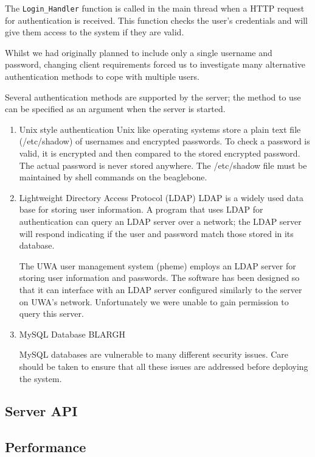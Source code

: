 The \verb/Login_Handler/ function is called in the main thread when a HTTP request for authentication is received. This function checks the user's credentials and will give them access to the system if they are valid.

Whilst we had originally planned to include only a single username and password, changing client requirements forced us to investigate many alternative authentication methods to cope with multiple users.

Several authentication methods are supported by the server; the method to use can be specified as an argument when the server is started.
\begin{enumerate}
  \item Unix style authentication
  Unix like operating systems store a plain text file (/etc/shadow) of usernames and encrypted passwords. To check a password is valid, it is encrypted and then compared to the stored encrypted password. The actual password is never stored anywhere. The /etc/shadow file must be maintained by shell commands on the beaglebone.

  \item Lightweight Directory Access Protocol (LDAP)
  LDAP is a widely used data base for storing user information. A program that uses LDAP for authentication can query an LDAP server over a network; the LDAP server will respond indicating if the user and password match those stored in its database.

  The UWA user management system (pheme) employs an LDAP server for storing user information and passwords. The software has been designed so that it can interface with an LDAP server configured similarly to the server on UWA's network. Unfortunately we were unable to gain permission to query this server.

  \item MySQL Database
  BLARGH

  MySQL databases are vulnerable to many different security issues. Care should be taken to ensure that all these issues are addressed before deploying the system.
\end{enumerate}

\subsection{Server API}

\subsection{Performance}

